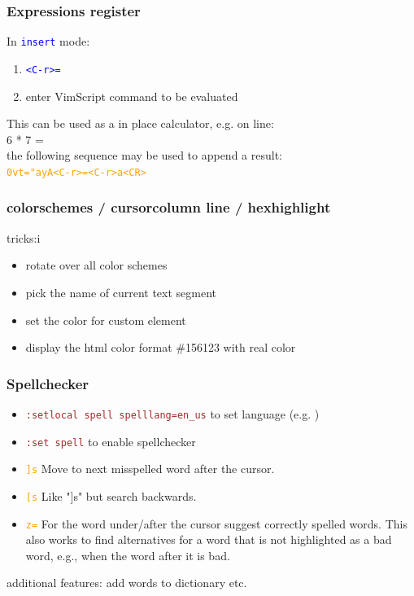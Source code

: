 \documentclass{beamer}
\newcommand{\vimmode}[1]{\texttt{#1}}
\newcommand{\viminsert}[1]{\texttt{\textcolor{blue}{#1}}}
\newcommand{\vimnormal}[1]{\texttt{\textcolor{orange}{#1}}}
\newcommand{\vimcommand}[1]{\texttt{\textcolor{brown}{#1}}}
\begin{document}
\begin{frame}
    \frametitle{Expressions register}
    In \viminsert{\vimmode{insert}} mode:
    \begin{enumerate}
        \item \viminsert{\textless{}C-r\textgreater{}=}
        \item enter VimScript command to be evaluated
    \end{enumerate}
    This can be used as a in place calculator, e.g. on line:\\
    \textrm{6 * 7 =}\\
    the following sequence may be used to append a result:\\
    \vimnormal{0vt="ayA\textless{}C-r\textgreater{}=\textless{}C-r\textgreater a\textless{}CR\textgreater}
\end{frame}

\begin{frame}
    \frametitle{colorschemes / cursorcolumn line / hexhighlight}
    tricks:i
    \begin{itemize}
        \item    rotate over all color schemes
        \item pick the name of current text segment
        \item set the color for custom element
        \item display the html color format \#156123 with real color
    \end{itemize}
\end{frame}

\begin{frame}
    \frametitle{Spellchecker}
    \begin{itemize}
        \item \vimcommand{:setlocal spell spelllang=en\_us} to set language (e.g. )
        \item \vimcommand{:set spell} to enable spellchecker
        \item \vimnormal{]s} Move to next misspelled word after the cursor.
        \item \vimnormal{[s} Like "]s" but search backwards.
        \item \vimnormal{z=} For the word under/after the cursor suggest correctly spelled words. This also works to find alternatives for a word that is not highlighted as a bad word, e.g., when the word after it is bad.
    \end{itemize}
    additional features: add words to dictionary etc.
\end{frame}
\end{document}
